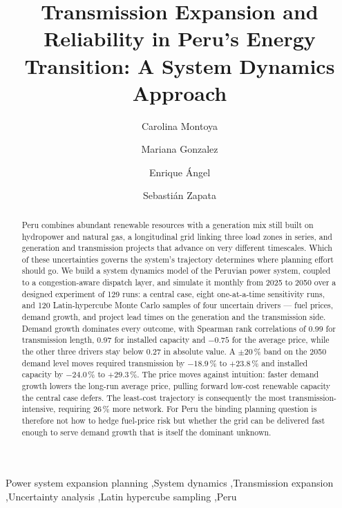 \documentclass[preprint,3p,times,11pt]{elsarticle}
\begin{document}
\begin{frontmatter}

\title{Transmission Expansion and Reliability in Peru's Energy Transition:
       A System Dynamics Approach}

\author[eia]{Carolina Montoya}
\author[eia]{Mariana Gonzalez}
\author[eia]{Enrique Ángel}
\author[eia]{Sebastián Zapata}

\begin{abstract}
Peru combines abundant renewable resources with a generation mix still built on
hydropower and natural gas, a longitudinal grid linking three load zones in series,
and generation and transmission projects that advance on very different timescales.
Which of these uncertainties governs the system's trajectory determines where planning
effort should go. We build a system dynamics model of the Peruvian power system,
coupled to a congestion-aware dispatch layer, and simulate it monthly from 2025 to 2050
over a designed experiment of 129 runs: a central case, eight one-at-a-time sensitivity
runs, and 120 Latin-hypercube Monte Carlo samples of four uncertain drivers --- fuel
prices, demand growth, and project lead times on the generation and the transmission
side. Demand growth dominates every outcome, with
Spearman rank correlations of 0.99 for transmission length, 0.97 for installed
capacity and $-0.75$ for the average price, while the other three drivers stay below
0.27 in absolute value. A $\pm$20\,\% band on the 2050 demand level moves required
transmission by $-18.9$\,\% to $+23.8$\,\% and installed capacity by $-24.0$\,\% to
$+29.3$\,\%. The price moves against intuition: faster demand growth lowers the
long-run average price, pulling forward low-cost renewable capacity the central case
defers. The least-cost trajectory is consequently the most transmission-intensive,
requiring 26\,\% more network. For Peru the binding planning question is therefore not
how to hedge fuel-price risk but whether the grid can be delivered fast enough to serve
demand growth that is itself the dominant unknown.
\end{abstract}

\begin{keyword}
Power system expansion planning \sep System dynamics \sep Transmission expansion
\sep Uncertainty analysis \sep Latin hypercube sampling \sep Peru
\end{keyword}

\end{frontmatter}
\end{document}
